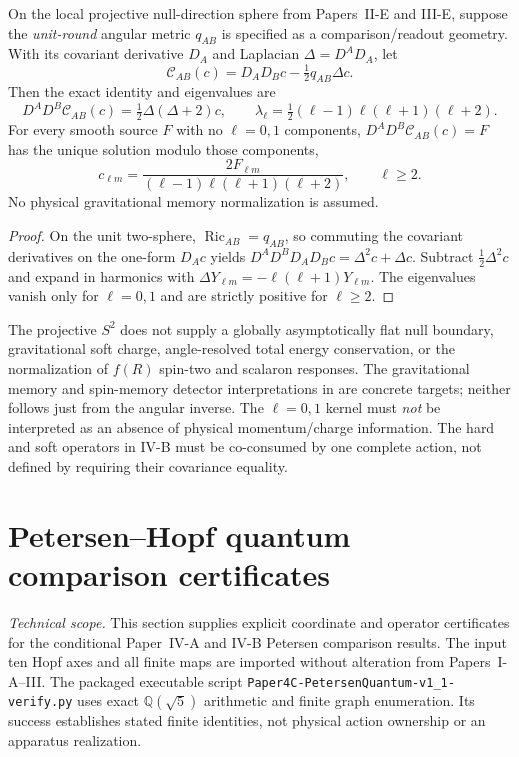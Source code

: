 \documentclass[12pt,a4paper]{article}
\begin{document}
\begin{proposition}
\label{p4c:prop:v254-angular-spin-two-inverse}
On the local projective null-direction sphere from Papers~II-E and
III-E, suppose the \emph{unit-round} angular metric $q_{AB}$ is
specified as a comparison/readout geometry. With its covariant
derivative $D_A$ and Laplacian $\Delta=D^AD_A$, let
\[
\mathcal C_{AB}(c)=D_AD_Bc-\tfrac12q_{AB}\Delta c.
\]
Then the exact identity and eigenvalues are
\[
\boxed{\ D^AD^B\mathcal C_{AB}(c)
=\tfrac12\Delta(\Delta+2)c,\qquad
\lambda_\ell=\tfrac12(\ell-1)\ell(\ell+1)(\ell+2).\ }
\]
For every smooth source $F$ with no $\ell=0,1$ components,
$D^AD^B\mathcal C_{AB}(c)=F$ has the unique solution
modulo those components,
\[
\boxed{\ c_{\ell m}=
\frac{2F_{\ell m}}{(\ell-1)\ell(\ell+1)(\ell+2)},
\qquad\ell\ge2.\ }
\]
No physical gravitational memory normalization is assumed.
\end{proposition}
\begin{proof}
On the unit two-sphere,
$\operatorname{Ric}_{AB}=q_{AB}$, so commuting the
covariant derivatives on the one-form $D_Ac$ yields
$D^AD^BD_AD_Bc=\Delta^2c+\Delta c$. Subtract
$\tfrac12\Delta^2c$ and expand in harmonics with
$\Delta Y_{\ell m}=-\ell(\ell+1)Y_{\ell m}$.
The eigenvalues vanish only for $\ell=0,1$ and are strictly
positive for $\ell\ge2$.
\end{proof}

\begin{remark}
The projective $S^2$ does not supply a globally asymptotically flat
null boundary, gravitational soft charge, angle-resolved total energy
conservation, or the normalization of $f(R)$ spin-two and scalaron
responses. The gravitational memory and spin-memory detector
interpretations in \cite{PasterskiStromingerZhiboedov2016Memory}
are concrete targets; neither follows just from the angular inverse.
The $\ell=0,1$ kernel must \emph{not} be interpreted as an absence
of physical momentum/charge information. The hard and soft operators
in IV-B must be co-consumed by one complete action, not defined by
requiring their covariance equality.
\end{remark}

\section{Petersen--Hopf quantum comparison certificates}
\label{p4c:sec:v320-petersen-certificates}
\noindent\textit{Technical scope.} This section supplies explicit
coordinate and operator certificates for the conditional Paper~IV-A
and IV-B Petersen comparison results. The input ten Hopf axes and
all finite maps are imported without alteration from Papers~I-A--III.
The packaged executable script
\texttt{Paper4C-PetersenQuantum-v1\_1-verify.py} uses exact
$\mathbb Q(\sqrt5)$ arithmetic and finite graph enumeration. Its
success establishes stated finite identities, not physical action
ownership or an apparatus realization.
\end{document}
